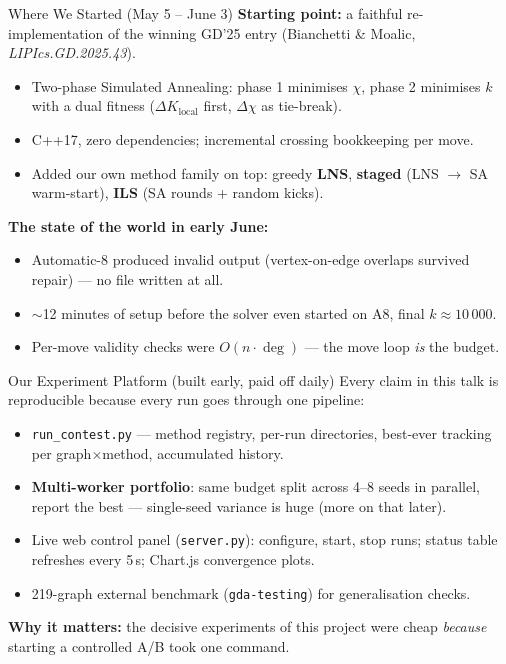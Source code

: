 \begin{frame}{Where We Started (May 5 -- June 3)}
  \textbf{Starting point:} a faithful re-implementation of the winning GD'25 entry
  (Bianchetti \& Moalic, \emph{LIPIcs.GD.2025.43}).
  \begin{itemize}
    \item Two-phase Simulated Annealing: phase 1 minimises $\chi$, phase 2 minimises $k$
          with a dual fitness ($\Delta K_{\text{local}}$ first, $\Delta\chi$ as tie-break).
    \item C++17, zero dependencies; incremental crossing bookkeeping per move.
    \item Added our own method family on top: greedy \textbf{LNS}, \textbf{staged}
          (LNS $\to$ SA warm-start), \textbf{ILS} (SA rounds + random kicks).
  \end{itemize}
  \medskip
  \textbf{The state of the world in early June:}
  \begin{itemize}
    \item Automatic-8 produced \alert{invalid output} (vertex-on-edge overlaps survived repair)
          --- no file written at all.
    \item $\sim$12 minutes of setup before the solver even started on A8, final $k\approx 10\,000$.
    \item Per-move validity checks were $O(n\cdot\deg)$ --- the move loop \emph{is} the budget.
  \end{itemize}
\end{frame}

\begin{frame}{Our Experiment Platform (built early, paid off daily)}
  Every claim in this talk is reproducible because every run goes through one pipeline:
  \begin{itemize}
    \item \texttt{run\_contest.py} --- method registry, per-run directories, best-ever
          tracking per graph$\times$method, accumulated history.
    \item \textbf{Multi-worker portfolio}: same budget split across 4--8 seeds in parallel,
          report the best --- single-seed variance is huge (more on that later).
    \item Live web control panel (\texttt{server.py}): configure, start, stop runs;
          status table refreshes every 5\,s; Chart.js convergence plots.
    \item 219-graph external benchmark (\texttt{gda-testing}) for generalisation checks.
  \end{itemize}
  \medskip
  \textbf{Why it matters:} the decisive experiments of this project were cheap
  \emph{because} starting a controlled A/B took one command.
\end{frame}

